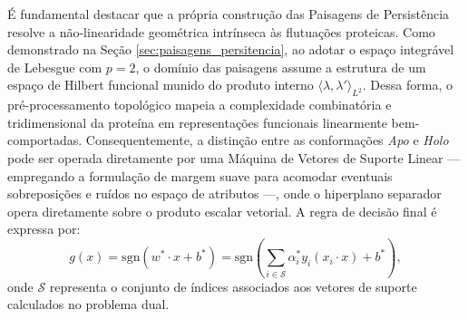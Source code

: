 \documentclass[12pt, a4paper]{article}
\theoremstyle{plain}
\theoremstyle{definition}
\theoremstyle{remark}
\newcommand{\ident}{\hspace{2em}}
\begin{document}

\ident É fundamental destacar que a própria construção das Paisagens de Persistência resolve a não-linearidade geométrica intrínseca às flutuações proteicas. Como demonstrado na Seção \ref{sec:paisagens_persitencia}, ao adotar o espaço integrável de Lebesgue com $p=2$, o domínio das paisagens assume a estrutura de um espaço de Hilbert funcional munido do produto interno $\langle\lambda,\lambda'\rangle_{L^2}$. Dessa forma, o pré-processamento topológico mapeia a complexidade combinatória e tridimensional da proteína em representações funcionais linearmente bem-comportadas. Consequentemente, a distinção entre as conformações \textit{Apo} e \textit{Holo} pode ser operada diretamente por uma Máquina de Vetores de Suporte Linear — empregando a formulação de margem suave para acomodar eventuais sobreposições e ruídos no espaço de atributos —, onde o hiperplano separador opera diretamente sobre o produto escalar vetorial. A regra de decisão final é expressa por:
\[
    g(x) = \text{sgn}\left( w^* \cdot x + b^* \right) = \text{sgn}\left( \sum_{i \in \mathcal{S}} \alpha_i^* y_i (x_i \cdot x) + b^* \right),
\]
onde $\mathcal{S}$ representa o conjunto de índices associados aos vetores de suporte calculados no problema dual.
\end{document}
